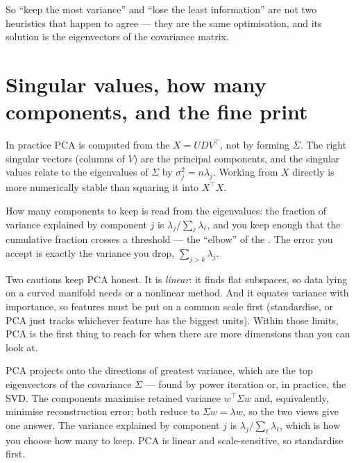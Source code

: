 \documentclass[11pt]{article}
\begin{document}
\noindent So ``keep the most variance'' and ``lose the least information'' are
not two heuristics that happen to agree --- they are the same optimisation,
and its solution is the eigenvectors of the covariance matrix.

\section{Singular values, how many components, and the fine print}

In practice PCA is computed from the 
$X = U D V^\top$, not by forming $\Sigma$. The right singular vectors
(columns of $V$) are the principal components, and the singular values relate
to the eigenvalues of $\Sigma$ by $\sigma_j^2 = n\lambda_j$. Working from $X$
directly is more numerically stable than squaring it into $X^\top X$.

How many components to keep is read from the eigenvalues: the fraction of
variance explained by component $j$ is $\lambda_j / \sum_\ell \lambda_\ell$,
and you keep enough that the cumulative fraction crosses a threshold --- the
``elbow'' of the . The error you accept is exactly the
variance you drop, $\sum_{j>k}\lambda_j$.

Two cautions keep PCA honest. It is \emph{linear}: it finds flat subspaces, so
data lying on a curved manifold needs  or a nonlinear
method. And it equates variance with importance, so features must be put on a
common scale first (standardise, or PCA just tracks whichever feature has the
biggest units). Within those limits, PCA is the first thing to reach for when
there are more dimensions than you can look at.

\begin{summarybox}
PCA projects onto the directions of greatest variance, which are the top
eigenvectors of the covariance $\Sigma$ --- found by power iteration or, in
practice, the SVD. The components maximise retained variance
$w^\top\Sigma w$ and, equivalently, minimise reconstruction error; both reduce
to $\Sigma w = \lambda w$, so the two views give one answer. The variance
explained by component $j$ is $\lambda_j/\sum_\ell\lambda_\ell$, which is how
you choose how many to keep. PCA is linear and scale-sensitive, so standardise
first.
\end{summarybox}
\end{document}
